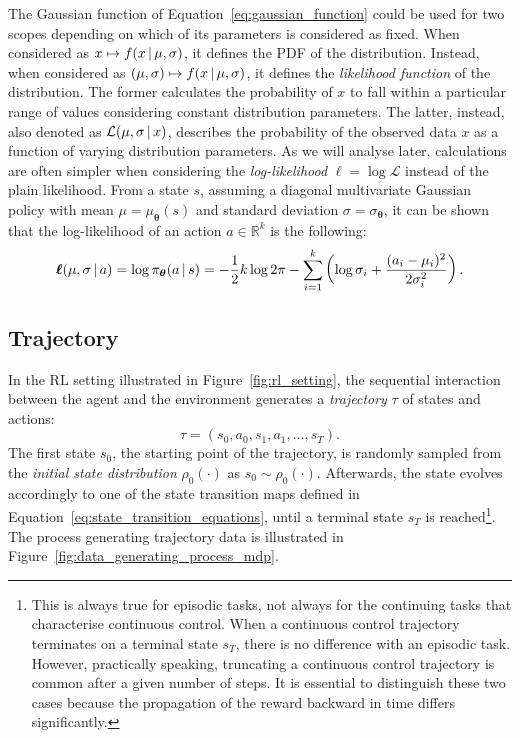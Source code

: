 \begin{remark*}
%
The Gaussian function of Equation~\eqref{eq:gaussian_function} could be used for two scopes depending on which of its parameters is considered as fixed.
When considered as $x \mapsto f(x \operatorname{\mid} \mu, \sigma)$, it defines the \ac{PDF} of the distribution.
Instead, when considered as $(\mu, \sigma) \mapsto f(x \operatorname{\mid} \mu, \sigma)$, it defines the \emph{likelihood function} of the distribution.
The former calculates the probability of $x$ to fall within a particular range of values considering constant distribution parameters.
The latter, instead, also denoted as $\mathcal{L}(\mu, \sigma \operatorname{\mid} x)$, describes the probability of the observed data $x$ as a function of varying distribution parameters.
As we will analyse later, calculations are often simpler when considering the \emph{log-likelihood} $\boldsymbol{\ell} = \log{\mathcal{L}}$ instead of the plain likelihood.
From a state $s$, assuming a diagonal multivariate Gaussian policy with mean $\mu = \mu_{\boldsymbol{\theta}}(s)$ and standard deviation $\sigma = \sigma_{\boldsymbol{\theta}}$, it can be shown that the log-likelihood of an action $a \in \mathbb{R}^k$ is the following:
%
\begin{equation}
    \boldsymbol{\ell}(\mu, \sigma \operatorname{\mid} a) =
    \log\pi_{\boldsymbol{\theta}}(a \operatorname{\mid} s) =
    -\frac{1}{2} k \log{2\pi} - \sum_{i=1}^{k} \left( \log{\sigma_i} + \frac{(a_i - \mu_i)^2}{2 \sigma_i^2} \right).
\end{equation}
%
\end{remark*}

\subsection{Trajectory}

In the \ac{RL} setting illustrated in Figure~\ref{fig:rl_setting}, 
the sequential interaction between the agent and the environment generates a \emph{trajectory} $\tau$ of states and actions:
%
\begin{equation*}
    \tau = (s_0, a_0, s_1, a_1, \dots, s_T).
\end{equation*}
%
The first state $s_0$, \ie the starting point of the trajectory, is randomly sampled from the \emph{initial state distribution} $\rho_0(\cdot)$ as $s_0 \sim \rho_0(\cdot)$.
Afterwards, the state evolves accordingly to one of the state transition maps defined in Equation~\eqref{eq:state_transition_equations}, until a terminal state $s_T$ is reached\footnote{This is always true for episodic tasks, not always for the continuing tasks that characterise continuous control.
When a continuous control trajectory terminates on a terminal state $s_T$, there is no difference with an episodic task.
However, practically speaking, truncating a continuous control trajectory is common after a given number of steps.
It is essential to distinguish these two cases because the propagation of the reward backward in time differs significantly.}.
The process generating trajectory data is illustrated in Figure~\ref{fig:data_generating_process_mdp}.

